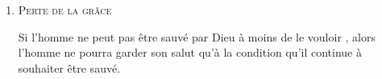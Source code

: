 \begin{enumerate}
  \item \textsc{Perte de la grâce}

Si l'homme ne peut pas être sauvé par Dieu à moins de le vouloir 
 ,
 alors l'homme ne pourra garder son salut qu'à la condition
 qu'il continue à souhaiter être sauvé.

\end{enumerate}




